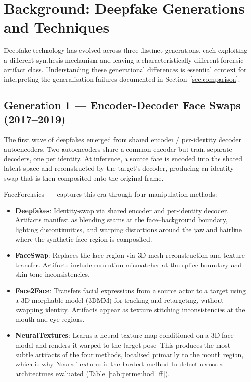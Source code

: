 \documentclass[conference]{IEEEtran}
\begin{document}
\section{Background: Deepfake Generations and Techniques}
\label{sec:background}

Deepfake technology has evolved across three distinct generations, each exploiting a different synthesis mechanism and leaving a characteristically different forensic artifact class. Understanding these generational differences is essential context for interpreting the generalisation failures documented in Section~\ref{sec:comparison}.

\subsection{Generation 1 --- Encoder-Decoder Face Swaps (2017--2019)}

The first wave of deepfakes emerged from shared encoder / per-identity decoder autoencoders. Two autoencoders share a common encoder but train separate decoders, one per identity. At inference, a source face is encoded into the shared latent space and reconstructed by the target's decoder, producing an identity swap that is then composited onto the original frame.

FaceForensics++ \cite{rossler2019faceforensics} captures this era through four manipulation methods:

\begin{itemize}
  \item \textbf{Deepfakes}: Identity-swap via shared encoder and per-identity decoder. Artifacts manifest as blending seams at the face--background boundary, lighting discontinuities, and warping distortions around the jaw and hairline where the synthetic face region is composited.

  \item \textbf{FaceSwap}: Replaces the face region via 3D mesh reconstruction and texture transfer. Artifacts include resolution mismatches at the splice boundary and skin tone inconsistencies.

  \item \textbf{Face2Face}: Transfers facial expressions from a source actor to a target using a 3D morphable model (3DMM) for tracking and retargeting, without swapping identity. Artifacts appear as texture stitching inconsistencies at the mouth and eye regions.

  \item \textbf{NeuralTextures}: Learns a neural texture map conditioned on a 3D face model and renders it warped to the target pose. This produces the most subtle artifacts of the four methods, localised primarily to the mouth region, which is why NeuralTextures is the hardest method to detect across all architectures evaluated (Table~\ref{tab:permethod_ff}).
\end{itemize}
\end{document}

